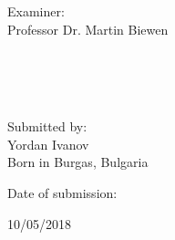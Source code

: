 \documentclass[12pt,]{article}
\begin{document}
\begin{titlepage}
\begin{minipage}[b!]{0.5\textwidth}
	\begin{flushright}
		\hspace*{1cm} \\
		\hspace*{1cm} \\
		\hspace*{1cm}
	\end{flushright}
\end{minipage}
%
\begin{minipage}[b!]{0.48\textwidth}
		\hspace*{1cm} Examiner: \\
		\hspace*{1cm} Professor Dr. Martin {\sc{}Biewen} \\
		\hspace*{1cm}
\end{minipage}
%
\begin{minipage}[b!]{0.5\textwidth}
	\begin{flushright}
		\hspace*{1cm} \\
		\hspace*{1cm} \\
		\hspace*{1cm} \\
		\hspace*{1cm}
	\end{flushright}
\end{minipage}
%
\begin{minipage}[b!]{0.48\textwidth}
		\hspace*{1cm} Submitted by: \\
		\hspace*{1cm} Yordan {\sc{}Ivanov} \\
		\hspace*{1cm} Born in Burgas, Bulgaria \\
		\hspace*{1cm}
\end{minipage}
%
\begin{minipage}[b!]{0.5\textwidth}
	\begin{flushright}
		Date of submission: 
	\end{flushright}
\end{minipage}
%
\begin{minipage}[b!]{0.48\textwidth}
		\hspace*{1cm} 10/05/2018 
\end{minipage}






\end{titlepage}
\end{document}
